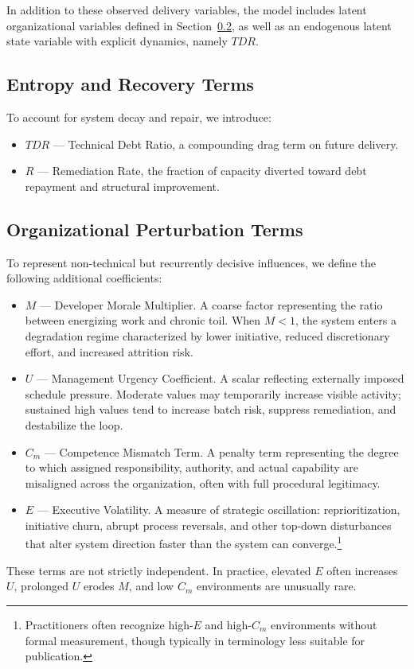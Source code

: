 \documentclass[letterpaper]{article}
\begin{document}
In addition to these observed delivery variables, the model includes latent organizational variables defined in Section~\ref{ssec:orgterms}, as well as an endogenous latent state variable with explicit dynamics, namely $TDR$.

\subsection{Entropy and Recovery Terms}

To account for system decay and repair, we introduce:
\begin{itemize}
    \item \textbf{$TDR$} --- Technical Debt Ratio, a compounding drag term on future delivery.
    \item \textbf{$R$} --- Remediation Rate, the fraction of capacity diverted toward debt repayment and structural improvement.
\end{itemize}

\subsection{Organizational Perturbation Terms} \label{ssec:orgterms}

To represent non-technical but recurrently decisive influences, we define the following additional coefficients:
\begin{itemize}
    \item \textbf{$M$} --- Developer Morale Multiplier. A coarse factor representing the ratio between energizing work and chronic toil. When $M < 1$, the system enters a degradation regime characterized by lower initiative, reduced discretionary effort, and increased attrition risk. 
    \item \textbf{$U$} --- Management Urgency Coefficient. A scalar reflecting externally imposed schedule pressure. Moderate values may temporarily increase visible activity; sustained high values tend to increase batch risk, suppress remediation, and destabilize the loop.
    \item \textbf{$C_m$} --- Competence Mismatch Term. A penalty term representing the degree to which assigned responsibility, authority, and actual capability are misaligned across the organization, often with full procedural legitimacy.
    \item \textbf{$E$} --- Executive Volatility. A measure of strategic oscillation: reprioritization, initiative churn, abrupt process reversals, and other top-down disturbances that alter system direction faster than the system can converge.\footnote{Practitioners often recognize high-$E$ and high-$C_m$ environments without formal measurement, though typically in terminology less suitable for publication.}
\end{itemize}
These terms are not strictly independent. In practice, elevated $E$ often increases $U$, prolonged $U$ erodes $M$, and low $C_m$ environments are unusually rare.
\end{document}
